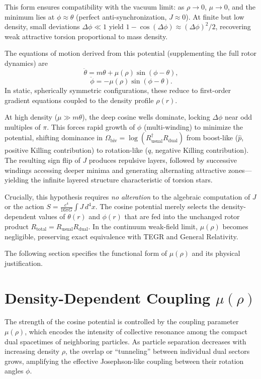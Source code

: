 \documentclass[a4paper]{article}
\begin{document}
This form ensures compatibility with the vacuum limit: as $\rho \to 0$, $\mu \to 0$, and the minimum lies at $\phi \approx \theta$ (perfect anti-synchronization, $J \approx 0$). At finite but low density, small deviations $\Delta\phi \ll 1$ yield $1 - \cos(\Delta\phi) \approx (\Delta\phi)^2 / 2$, recovering weak attractive torsion proportional to mass density.

The equations of motion derived from this potential (supplementing the full rotor dynamics) are
\[
\ddot{\theta} = m \theta + \mu(\rho) \sin(\phi - \theta),
\]
\[
\ddot{\phi} = -\mu(\rho) \sin(\phi - \theta).
\]
In static, spherically symmetric configurations, these reduce to first-order gradient equations coupled to the density profile $\rho(r)$.

At high density ($\mu \gg m \theta$), the deep cosine wells dominate, locking $\Delta\phi$ near odd multiples of $\pi$. This forces rapid growth of $\phi$ (multi-winding) to minimize the potential, shifting dominance in $\Omega_\text{biv} = \log(R_\text{usual}^\dagger R_\text{dual})$ from boost-like ($\hat{p}$, positive Killing contribution) to rotation-like ($\hat{q}$, negative Killing contribution). The resulting sign flip of $J$ produces repulsive layers, followed by successive windings accessing deeper minima and generating alternating attractive zones—yielding the infinite layered structure characteristic of torsion stars.

Crucially, this hypothesis requires \emph{no alteration} to the algebraic computation of $J$ or the action $S = \frac{c^4}{16\pi G} \int J \, d^4x$. The cosine potential merely selects the density-dependent values of $\theta(r)$ and $\phi(r)$ that are fed into the unchanged rotor product $R_\text{total} = R_\text{usual} R_\text{dual}$. In the continuum weak-field limit, $\mu(\rho)$ becomes negligible, preserving exact equivalence with TEGR and General Relativity.

The following section specifies the functional form of $\mu(\rho)$ and its physical justification.

\section{Density-Dependent Coupling $\mu(\rho)$}
\label{sec:mu}

The strength of the cosine potential is controlled by the coupling parameter $\mu(\rho)$, which encodes the intensity of collective resonance among the compact dual spacetimes of neighboring particles. As particle separation decreases with increasing density $\rho$, the overlap or ``tunneling'' between individual dual sectors grows, amplifying the effective Josephson-like coupling between their rotation angles $\phi$.
\end{document}
